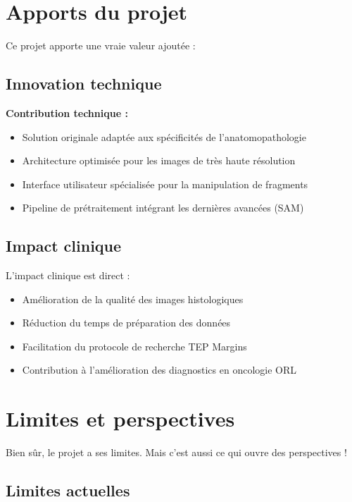 \documentclass[11pt,a4paper]{report}
\begin{document}
\section{Apports du projet}

Ce projet apporte une vraie valeur ajoutée :

\subsection{Innovation technique}

\textbf{Contribution technique :}
\begin{itemize}
\item Solution originale adaptée aux spécificités de l'anatomopathologie
\item Architecture optimisée pour les images de très haute résolution
\item Interface utilisateur spécialisée pour la manipulation de fragments
\item Pipeline de prétraitement intégrant les dernières avancées (SAM)
\end{itemize}

\subsection{Impact clinique}

L'impact clinique est direct :

\begin{itemize}
\item Amélioration de la qualité des images histologiques
\item Réduction du temps de préparation des données
\item Facilitation du protocole de recherche TEP Margins
\item Contribution à l'amélioration des diagnostics en oncologie ORL
\end{itemize}

\section{Limites et perspectives}

Bien sûr, le projet a ses limites. Mais c'est aussi ce qui ouvre des perspectives !

\subsection{Limites actuelles}
\end{document}

